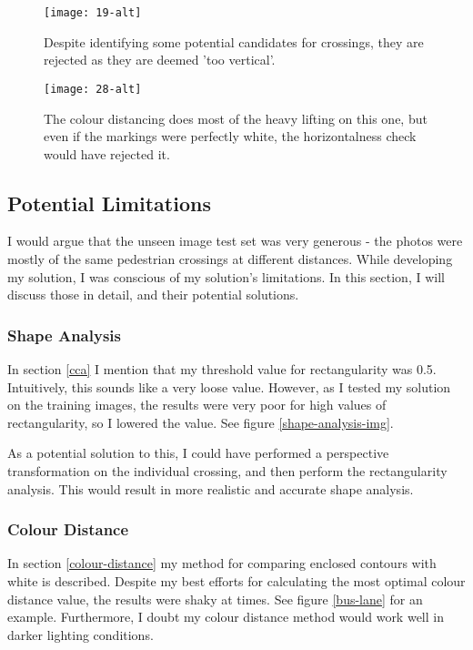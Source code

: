\documentclass{article}  %
\begin{document}
	\begin{figure}[H]
		\begin{minipage}[c]{0.45\linewidth}
			\centering
			\texttt{[image: 19-alt]}
			\caption{Despite identifying some potential candidates for crossings, they are rejected as they are deemed 'too vertical'.}
		\end{minipage}\hfill
		\begin{minipage}[c]{0.45\linewidth}
		\centering
		\texttt{[image: 28-alt]}
		\caption{The colour distancing does most of the heavy lifting on this one, but even if the markings were perfectly white, the horizontalness check would have rejected it.}
		\end{minipage}
	\end{figure}
	
	\subsection{Potential Limitations}
	
	I would argue that the unseen image test set was very generous - the photos were mostly of the same pedestrian crossings at different distances. While developing my solution, I was conscious of my solution's limitations. In this section, I will discuss those in detail, and their potential solutions.
	
	\subsubsection{Shape Analysis}
	
	In section \ref{cca} I mention that my threshold value for rectangularity was 0.5. Intuitively, this sounds like a very loose value. However, as I tested my solution on the training images, the results were very poor for high values of rectangularity, so I lowered the value. See figure \ref{shape-analysis-img}.
	
	As a potential solution to this, I could have performed a perspective transformation on the individual crossing, and then perform the rectangularity analysis. This would result in more realistic and accurate shape analysis.
	
	\subsubsection{Colour Distance}
	
	In section \ref{colour-distance} my method for comparing enclosed contours with white is described. Despite my best efforts for calculating the most optimal colour distance value, the results were shaky at times. See figure \ref{bus-lane} for an example. Furthermore, I doubt my colour distance method would work well in darker lighting conditions.
	
\end{document}
